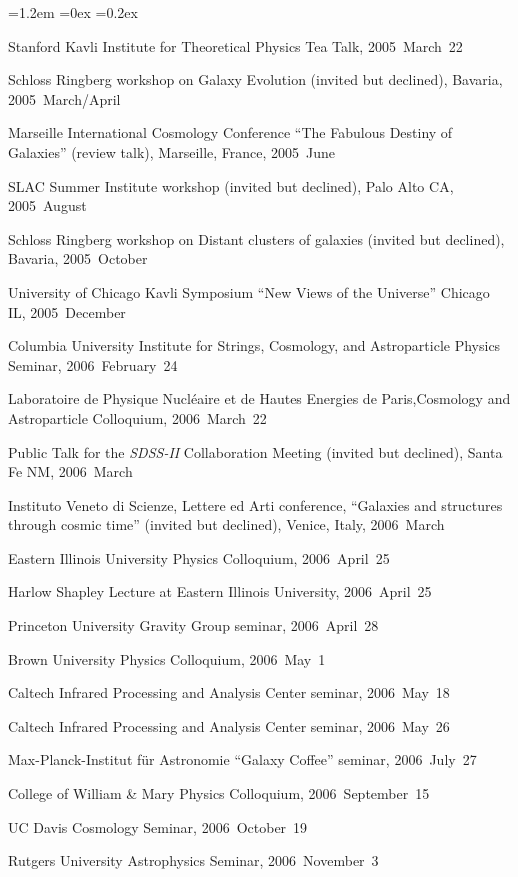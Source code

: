 \documentclass[10pt,letterpaper]{article}
\newcommand{\acronym}[1]{{\small{#1}}}
\newcommand{\project}[1]{\textsl{#1}}
\newcounter{refpubnum}
\newcommand{\hogglist}{%
    \rightmargin=0in
    \leftmargin=1.2em
    \topsep=0ex
    \partopsep=0pt
    \itemsep=0.2ex
    \parsep=0pt
    \itemindent=-1.0\leftmargin
    \listparindent=0.0\leftmargin
    \settowidth{\labelsep}{~}
    \usecounter{refpubnum}
  }
\begin{document}
\begin{list}{}{\hogglist}
{\item Stanford Kavli Institute for Theoretical Physics Tea Talk, 2005~March~22
\item Schloss Ringberg workshop on Galaxy Evolution (invited but declined), Bavaria, 2005~March/April
\item Marseille International Cosmology Conference ``The Fabulous Destiny of Galaxies'' (review talk), Marseille, France, 2005~June
\item SLAC Summer Institute workshop (invited but declined), Palo Alto CA, 2005~August
\item Schloss Ringberg workshop on Distant clusters of galaxies (invited but declined), Bavaria, 2005~October
\item University of Chicago Kavli Symposium ``New Views of the Universe'' Chicago IL, 2005~December
\item Columbia University Institute for Strings, Cosmology, and Astroparticle Physics Seminar, 2006~February~24
\item Laboratoire de Physique Nucl\'{e}aire et de Hautes Energies de Paris,Cosmology and Astroparticle Colloquium, 2006~March~22
\item Public Talk for the \project{\acronym{SDSS-II}} Collaboration Meeting (invited but declined), Santa Fe NM, 2006~March
\item Instituto Veneto di Scienze, Lettere ed Arti conference, ``Galaxies and structures through cosmic time'' (invited but declined), Venice, Italy, 2006~March
\item Eastern Illinois University Physics Colloquium, 2006~April~25
\item Harlow Shapley Lecture at Eastern Illinois University, 2006~April~25
\item Princeton University Gravity Group seminar, 2006~April~28
\item Brown University Physics Colloquium, 2006~May~1
\item Caltech Infrared Processing and Analysis Center seminar, 2006~May~18
\item Caltech Infrared Processing and Analysis Center seminar, 2006~May~26
\item Max-Planck-Institut f\"ur Astronomie ``Galaxy Coffee'' seminar, 2006~July~27
\item College of William \& Mary Physics Colloquium, 2006~September~15
\item UC Davis Cosmology Seminar, 2006~October~19
\item Rutgers University Astrophysics Seminar, 2006~November~3
}
\end{list}
\end{document}
